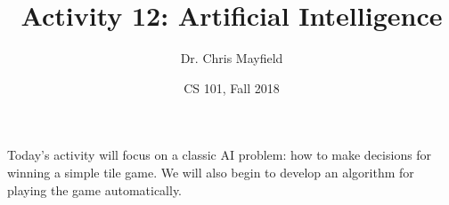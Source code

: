 \documentclass[12pt]{article}
\title{Activity 12: Artificial Intelligence}
\author{Dr. Chris Mayfield}
\date{CS 101, Fall 2018}
\begin{document}
\maketitle

Today's activity will focus on a classic AI problem: how to make decisions for winning a simple tile game.
We will also begin to develop an algorithm for playing the game automatically.



\end{document}
